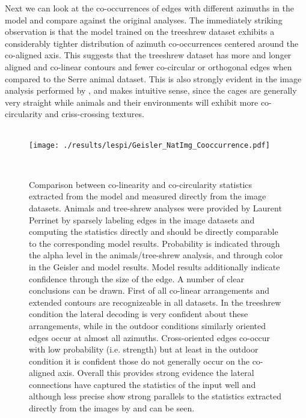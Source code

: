 Next we can look at the co-occurrences of edges with different
azimuths in the model and compare against the original analyses. The
immediately striking observation is that the model trained on the
treeshrew dataset exhibits a considerably tighter distribution of
azimuth co-occurrences centered around the co-aligned axis. This
suggests that the treeshrew dataset has more and longer aligned and
co-linear contours and fewer co-circular or orthogonal edges when
compared to the Serre animal dataset. This is also strongly evident in
the image analysis performed by \cite{Perrinet2015}, and makes
intuitive sense, since the cages are generally very straight while
animals and their environments will exhibit more co-circularity and
criss-crossing textures.

\begin{figure}
  \begin{minipage}[t]{0.6\textwidth}
    \mbox{}\\[-\baselineskip]    \texttt{[image: ./results/lespi/Geisler\_NatImg\_Cooccurrence.pdf]}
  \end{minipage}\hfill
  \begin{minipage}[t]{0.35\textwidth}
    \mbox{}\\[-\baselineskip]
	\caption{Comparison between co-linearity and co-circularity
      statistics extracted from the model and measured directly from
      the image datasets. Animals and tree-shrew analyses were
      provided by Laurent Perrinet by sparsely labeling edges in the
      image datasets and computing the statistics directly and should
      be directly comparable to the corresponding model
      results. Probability is indicated through the alpha level in the
      animals/tree-shrew analysis, and through color in the Geisler
      and model results. Model results additionally indicate
      confidence through the size of the edge. A number of clear
      conclusions can be drawn. First of all co-linear arrangements
      and extended contours are recognizeable in all datasets. In the
      treeshrew condition the lateral decoding is very confident about
      these arrangements, while in the outdoor conditions similarly
      oriented edges occur at almost all azimuths. Cross-oriented
      edges co-occur with low probability (i.e. strength) but at least
      in the outdoor condition it is confident those do not generally
      occur on the co-aligned axis. Overall this provides strong
      evidence the lateral connections have captured the statistics of
      the input well and although less precise show strong parallels
      to the statistics extracted directly from the images by
      \cite{Geisler2001} and \cite{Perrinet2015} can be seen.}
	\label{NatImgGeisler}
    \end{minipage}
\end{figure}

